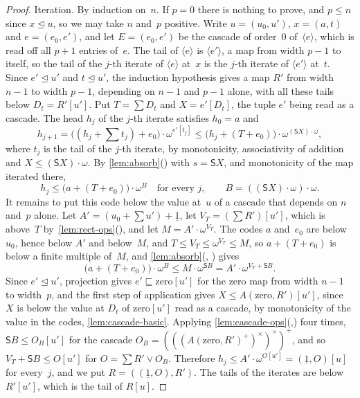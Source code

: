 \documentclass[11pt]{amsart}
\newcommand{\bS}{\mathsf{S}}
\newcommand{\bplus}{\mathbin{+}}
\newcommand{\btimes}{\mathbin{\cdot}}
\newcommand{\num}[1]{\underline{#1}}          %
\newcommand{\tsum}[1]{\textstyle\sum #1}
\newcommand{\tle}{\mathrel{\sqsubseteq}}      %
\newcommand{\tsub}{\mathrel{\trianglelefteq}} %
\newcommand{\act}[2]{#1[#2]}                  %
\newcommand{\rd}[1]{\langle #1 \rangle}       %
\theoremstyle{plain}
\theoremstyle{definition}
\begin{document}
\begin{proof}
Iteration. By induction on~$n$. If $p = 0$ there is nothing to prove,
and $p \le n$ since $x \tsub u$, so we may take $n$ and~$p$ positive.
Write $u = (u_0, u')$, $x = (a, t)$ and $e = (e_0, e')$, and let
$E = (e_0, e')$ be the cascade of order~$0$ of~$\rd e$, which is read
off all $p+1$ entries of~$e$. The tail of $\rd e$ is $\rd{e'}$, a map
from width $p-1$ to itself, so the tail of the $j$-th iterate of
$\rd e$ at~$x$ is the $j$-th iterate of $\rd{e'}$ at~$t$. Since
$e' \tsub u'$ and $t \tsub u'$, the induction hypothesis gives a map
$R'$ from width $n-1$ to width $p-1$, depending on $n-1$ and $p-1$
alone, with all these tails below $D_t = \act{R'}{u'}$. Put
$T = \tsum D_t$ and $X = \act{e'}{D_t}$, the tuple $e'$ being read as
a cascade. The head $h_j$ of the $j$-th iterate satisfies $h_0 = a$
and
\[
  h_{j+1} = \big((h_j \bplus \tsum t_j) \bplus e_0\big) \btimes
    \omega^{\act{e'}{t_j}}
  \le \big(h_j \bplus (T \bplus e_0)\big) \btimes
    \omega^{(\bS X) \btimes \omega} ,
\]
where $t_j$ is the tail of the $j$-th iterate, by monotonicity,
associativity of addition and $X \le (\bS X) \btimes \omega$. By
\cref{lem:absorb}() with $s = \bS X$, and
monotonicity of the map iterated there,
\[
  h_j \le \big(a \bplus (T \bplus e_0)\big) \btimes \omega^{B}
  \quad \text{for every } j, \qquad
  B = ((\bS X) \btimes \omega) \btimes \omega .
\]
It remains to put this code below the value at~$u$ of a cascade that
depends on $n$ and~$p$ alone. Let
$A' = (u_0 \bplus \tsum u') \bplus \num 1$, let
$V_T = \act{(\tsum R')}{u'}$, which is above~$T$
by~\cref{lem:rect-ops}(), and let
$M = A' \btimes \omega^{V_T}$. The codes $a$ and~$e_0$ are below
$u_0$, hence below $A'$ and below~$M$, and $T \le V_T \le \omega^{V_T}
\le M$, so $a \bplus (T \bplus e_0)$ is below a finite multiple
of~$M$, and \cref{lem:absorb}(,%
) gives
\[
  \big(a \bplus (T \bplus e_0)\big) \btimes \omega^{B}
  \le M \btimes \omega^{\bS B}
  = A' \btimes \omega^{V_T \bplus \bS B} .
\]
Since $e' \tsub u'$, projection gives $e' \tle \act{\mathrm{zero}}{u'}$
for the zero map from width $n-1$ to width~$p$, and the first step of
application gives $X \le \act{A(\mathrm{zero}, R')}{u'}$, since $X$ is
below the value at $D_t$ of $\act{\mathrm{zero}}{u'}$ read as a
cascade, by monotonicity of the value in the codes,
\cref{lem:cascade-basic}. Applying
\cref{lem:cascade-ops}(,)
four times,
$\bS B \le \act{O_B}{u'}$ for the cascade
$O_B = (((A(\mathrm{zero}, R')^{+})^{\times})^{\times})^{+}$, and so
$V_T \bplus \bS B \le \act{O}{u'}$ for $O = \tsum R' \vee O_B$.
Therefore $h_j \le A' \btimes \omega^{\act O {u'}} =
\act{(\num 1, O)}{u}$ for every~$j$, and we put
$R = ((\num 1, O), R')$. The tails of the iterates are below
$\act{R'}{u'}$, which is the tail of $\act R u$.


\end{proof}
\end{document}
